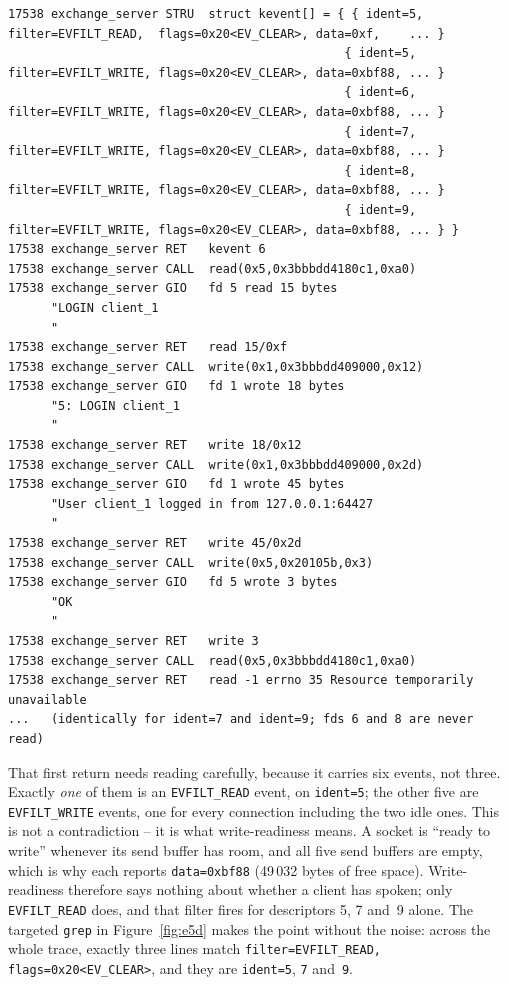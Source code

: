 \documentclass[11pt,a4paper]{article}
\begin{document}
\begin{lstlisting}
17538 exchange_server STRU  struct kevent[] = { { ident=5, filter=EVFILT_READ,  flags=0x20<EV_CLEAR>, data=0xf,    ... }
                                               { ident=5, filter=EVFILT_WRITE, flags=0x20<EV_CLEAR>, data=0xbf88, ... }
                                               { ident=6, filter=EVFILT_WRITE, flags=0x20<EV_CLEAR>, data=0xbf88, ... }
                                               { ident=7, filter=EVFILT_WRITE, flags=0x20<EV_CLEAR>, data=0xbf88, ... }
                                               { ident=8, filter=EVFILT_WRITE, flags=0x20<EV_CLEAR>, data=0xbf88, ... }
                                               { ident=9, filter=EVFILT_WRITE, flags=0x20<EV_CLEAR>, data=0xbf88, ... } }
17538 exchange_server RET   kevent 6
17538 exchange_server CALL  read(0x5,0x3bbbdd4180c1,0xa0)
17538 exchange_server GIO   fd 5 read 15 bytes
      "LOGIN client_1
      "
17538 exchange_server RET   read 15/0xf
17538 exchange_server CALL  write(0x1,0x3bbbdd409000,0x12)
17538 exchange_server GIO   fd 1 wrote 18 bytes
      "5: LOGIN client_1
      "
17538 exchange_server RET   write 18/0x12
17538 exchange_server CALL  write(0x1,0x3bbbdd409000,0x2d)
17538 exchange_server GIO   fd 1 wrote 45 bytes
      "User client_1 logged in from 127.0.0.1:64427
      "
17538 exchange_server RET   write 45/0x2d
17538 exchange_server CALL  write(0x5,0x20105b,0x3)
17538 exchange_server GIO   fd 5 wrote 3 bytes
      "OK
      "
17538 exchange_server RET   write 3
17538 exchange_server CALL  read(0x5,0x3bbbdd4180c1,0xa0)
17538 exchange_server RET   read -1 errno 35 Resource temporarily unavailable
...   (identically for ident=7 and ident=9; fds 6 and 8 are never read)
\end{lstlisting}

That first return needs reading carefully, because it carries six events, not three.
Exactly \emph{one} of them is an \texttt{EVFILT\_READ} event, on \texttt{ident=5}; the
other five are \texttt{EVFILT\_WRITE} events, one for every connection including the two
idle ones.  This is not a contradiction -- it is what write-readiness means.  A socket is
``ready to write'' whenever its send buffer has room, and all five send buffers are
empty, which is why each reports \texttt{data=0xbf88} (49\,032 bytes of free space).
Write-readiness therefore says nothing about whether a client has spoken; only
\texttt{EVFILT\_READ} does, and that filter fires for descriptors 5, 7 and~9 alone.  The
targeted \texttt{grep} in Figure~\ref{fig:e5d} makes the point without the noise: across
the whole trace, exactly three lines match
\texttt{filter=EVFILT\_READ, flags=0x20<EV\_CLEAR>}, and they are \texttt{ident=5},
\texttt{7} and~\texttt{9}.
\end{document}
